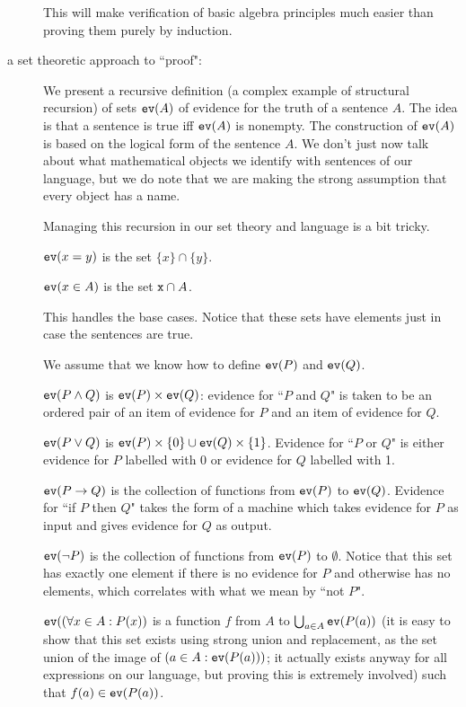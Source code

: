 \documentclass[12pt]{article}
\begin{document}
\begin{description}
This will make verification of basic algebra principles much easier than proving them purely by induction.

\item[a set theoretic approach to ``proof":]

We present a recursive definition (a complex example of structural recursion) of sets ${\tt ev}(A)$ of evidence
for the truth of a sentence $A$.  The idea is that a sentence is true iff ${\tt ev}(A)$ is nonempty.  The construction of
${\tt ev}(A)$ is based on the logical form of the sentence $A$.  We don't just now talk about what mathematical objects we identify with sentences of our language, but we do note that we are making the strong assumption that every object has a name.

Managing this recursion in our set theory and language is a bit tricky.

${\tt ev}(x=y)$ is the set $\{x\} \cap \{y\}$.

${\tt ev}(x \in A)$ is the set ${\tt x} \cap A$.

This handles the base cases.  Notice that these sets have elements just in case the sentences are true.

We assume that we know how to define ${\tt ev}(P)$ and ${\tt ev}(Q)$.

${\tt ev}(P \wedge Q)$ is ${\tt ev}(P) \times {\tt ev}(Q)$:  evidence for ``$P$ and $Q$" is taken to be an ordered pair of an item of evidence for $P$ and an item of evidence for $Q$.

${\tt ev}(P \vee Q)$ is ${\tt ev}(P) \times \{0\} \cup {\tt ev}(Q) \times \{1\}$.  Evidence for ``$P$ or $Q$"
is either evidence for $P$ labelled with 0 or evidence for $Q$ labelled with 1.

${\tt ev}(P \rightarrow Q)$ is the collection of functions from ${\tt ev}(P)$ to ${\tt ev}(Q)$.  Evidence for  ``if $P$ then $Q$" takes the form of a machine which takes evidence for $P$ as input and gives evidence for $Q$ as output.

${\tt ev}(\neg P)$ is the collection of functions from ${\tt ev}(P)$ to $\emptyset$.  Notice that this set
has exactly one element if there is no evidence for $P$ and otherwise has no elements, which correlates with what we mean by ``not $P$".

${\tt ev}((\forall x\in A :P(x))$ is a function $f$ from $A$ to $\bigcup_{a \in A}{\tt ev}(P(a))$ (it is easy to show that this set exists using strong union and replacement, as the set union of the image of $(a \in A:{\tt ev}(P(a)))$; it actually exists anyway for all expressions on our language, but proving this is extremely involved) such that $f(a) \in {\tt ev}(P(a))$.


\end{description}
\end{document}
